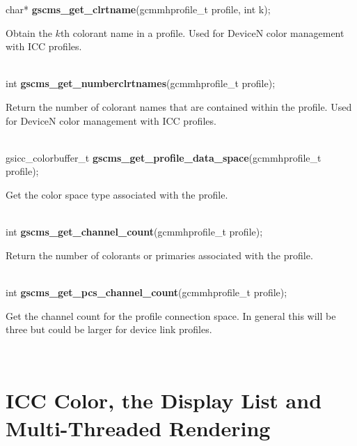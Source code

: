 \documentclass[12pt,notitlepage]{article}
\begin{document}
\noindent char* {\bf gscms\_get\_clrtname}(gcmmhprofile\_t profile, int k);\\

\begin{minipage}[h]{6.0in}
Obtain the $k$th colorant name in a profile.  Used for DeviceN color management with ICC profiles.
\end{minipage}\\

\noindent int {\bf gscms\_get\_numberclrtnames}(gcmmhprofile\_t profile);\\

\begin{minipage}[h]{6.0in}
Return the number of colorant names that are contained within the profile.  Used for DeviceN color management with ICC profiles.
\end{minipage}\\

\noindent gsicc\_colorbuffer\_t {\bf gscms\_get\_profile\_data\_space}(gcmmhprofile\_t profile);\\

\begin{minipage}[h]{6.0in}
Get the color space type associated with the profile.
\end{minipage}\\

\noindent int {\bf gscms\_get\_channel\_count}(gcmmhprofile\_t profile);\\

\begin{minipage}[h]{6.0in}
Return the number of colorants or primaries associated with the profile.
\end{minipage}\\

\noindent int {\bf gscms\_get\_pcs\_channel\_count}(gcmmhprofile\_t profile);\\

\begin{minipage}[h]{6.0in}
Get the channel count for the profile connection space.  In general this will be three but could be larger for device link profiles.
\end{minipage}\\

\singlespace

\section{ICC Color, the Display List and Multi-Threaded Rendering}
\end{document}
